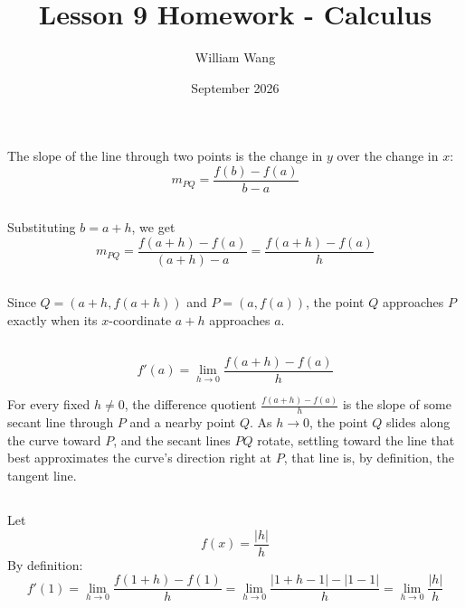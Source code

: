 \documentclass{article}
\title{Lesson 9 Homework - Calculus}
\author{William Wang}
\date{September 2026}
\begin{document}
\maketitle

\section{}

\subsection{}

The slope of the line through two points is the change in $y$ over the change in $x$:
\[
m_{PQ} = \frac{f(b)-f(a)}{b-a}
\]

\subsection{}

Substituting $b = a+h$, we get
\[
m_{PQ} = \frac{f(a+h)-f(a)}{(a+h)-a} = \frac{f(a+h)-f(a)}{h}
\]

\subsection{}

Since $Q = (a+h, f(a+h))$ and $P = (a, f(a))$, the point $Q$ approaches $P$ exactly when its $x$-coordinate $a+h$ approaches $a$.
\subsection{}
\[
f'(a) = \lim_{h \to 0} \frac{f(a+h)-f(a)}{h}
\]

For every fixed $h \neq 0$, the difference quotient $\frac{f(a+h)-f(a)}{h}$ is the slope of some secant line through $P$ and a nearby point $Q$. As $h \to 0$, the point $Q$ slides along the curve toward $P$, and the secant lines $PQ$ rotate, settling toward the line that best approximates the curve's direction right at $P$,  that line is, by definition, the tangent line.

\subsection{}

Let 
\[f(x) = \frac{|h|}{h}\]
By definition:
\[
f'(1) = \lim_{h \to 0} \frac{f(1+h)-f(1)}{h} = \lim_{h \to 0} \frac{|1+h-1| - |1-1|}{h} = \lim_{h \to 0} \frac{|h|}{h}
\]
\end{document}
